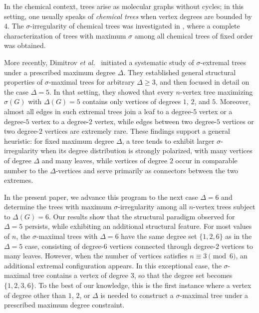 \documentclass[preprint,12pt]{elsarticle}
\begin{document}
In the chemical context, trees arise as molecular graphs without cycles; in this setting, 
one usually speaks of \emph{chemical trees} when vertex degrees are bounded by $4$. 
The $\sigma$-irregularity of chemical trees was investigated in 
\cite{Kovijanic2024}, where a complete characterization of trees with 
maximum $\sigma$ among all chemical trees of fixed order was obtained.


More recently, Dimitrov \emph{et al.}~\cite{Dimitrov2026} initiated a systematic 
study of $\sigma$-extremal trees under a prescribed maximum degree $\Delta$. 
They established general structural properties of $\sigma$-maximal trees for 
arbitrary $\Delta\ge 3$, and then focused in detail on the case $\Delta=5$. 
In that setting, they showed that every $n$-vertex tree maximizing $\sigma(G)$ 
with $\Delta(G)=5$ contains only vertices of degrees $1$, $2$, and $5$. 
Moreover, almost all edges in such extremal trees join a leaf to a degree-$5$ 
vertex or a degree-$5$ vertex to a degree-$2$ vertex, while edges between two 
degree-$5$ vertices or two degree-$2$ vertices are extremely rare. 
These findings support a general heuristic: for fixed maximum degree $\Delta$, a tree tends to exhibit larger $\sigma$-irregularity when its degree distribution is strongly polarized, with many vertices of degree $\Delta$ and many leaves, while vertices of degree $2$ occur in comparable number to the $\Delta$-vertices and serve primarily as connectors between the two extremes.

In the present paper, we advance this program to the next case $\Delta=6$ and 
determine the trees with maximum $\sigma$-irregularity among all $n$-vertex trees 
subject to $\Delta(G)=6$. 
Our results show that the structural paradigm observed for $\Delta=5$ persists, while exhibiting an additional structural feature. 
For most values of $n$, the $\sigma$-maximal trees with $\Delta=6$ have the same 
degree set $\{1,2,6\}$ as in the $\Delta=5$ case, consisting of degree-$6$ vertices 
connected through degree-$2$ vertices to many leaves. 
However, when the number of vertices satisfies $n\equiv 3 \pmod{6}$, an 
additional extremal configuration appears. 
In this exceptional case, the $\sigma$-maximal tree contains a vertex of degree 
$3$, so that the degree set becomes $\{1,2,3,6\}$. 
To the best of our knowledge, this is the first instance where a vertex of degree 
other than $1$, $2$, or $\Delta$ is needed to construct a $\sigma$-maximal tree 
under a prescribed maximum degree constraint.
\end{document}
